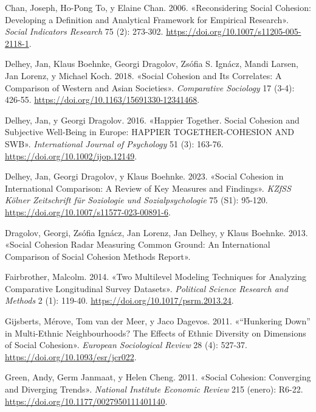 \documentclass[
  spanish,
  letterpaper,
  DIV=11,
  numbers=noendperiod]{scrartcl}
\newlength{\cslhangindent}
\newenvironment{CSLReferences}[2] %
 {\begin{list}{}{%
  \setlength{\itemindent}{0pt}
  \setlength{\leftmargin}{0pt}
  \setlength{\parsep}{0pt}
  \ifodd #1
   \setlength{\leftmargin}{\cslhangindent}
   \setlength{\itemindent}{-1\cslhangindent}
  \fi
  \setlength{\itemsep}{#2\baselineskip}}}
 {\end{list}}
\begin{document}
\begin{CSLReferences}{1}{0}
Chan, Joseph, Ho-Pong To, y Elaine Chan. 2006. {«Reconsidering {Social
Cohesion}: {Developing} a {Definition} and {Analytical Framework} for
{Empirical Research}»}. \emph{Social Indicators Research} 75 (2):
273-302. \url{https://doi.org/10.1007/s11205-005-2118-1}.

Delhey, Jan, Klaus Boehnke, Georgi Dragolov, Zsófia S. Ignácz, Mandi
Larsen, Jan Lorenz, y Michael Koch. 2018. {«Social {Cohesion} and {Its
Correlates}: A {Comparison} of {Western} and {Asian Societies}»}.
\emph{Comparative Sociology} 17 (3-4): 426-55.
\url{https://doi.org/10.1163/15691330-12341468}.

Delhey, Jan, y Georgi Dragolov. 2016. {«Happier {Together}. {Social
Cohesion} and {Subjective Well-Being} in {Europe}: {HAPPIER
TOGETHER-COHESION AND SWB}»}. \emph{International Journal of Psychology}
51 (3): 163-76. \url{https://doi.org/10.1002/ijop.12149}.

Delhey, Jan, Georgi Dragolov, y Klaus Boehnke. 2023. {«Social {Cohesion}
in {International Comparison}: A {Review} of {Key Measures} and
{Findings}»}. \emph{KZfSS K{ö}lner Zeitschrift f{ü}r Soziologie und
Sozialpsychologie} 75 (S1): 95-120.
\url{https://doi.org/10.1007/s11577-023-00891-6}.

Dragolov, Georgi, Zsófia Ignácz, Jan Lorenz, Jan Delhey, y Klaus
Boehnke. 2013. {«Social {Cohesion Radar Measuring Common Ground}: {An
International Comparison} of {Social Cohesion Methods Report}»}.

Fairbrother, Malcolm. 2014. {«Two {Multilevel Modeling Techniques} for
{Analyzing Comparative Longitudinal Survey Datasets}»}. \emph{Political
Science Research and Methods} 2 (1): 119-40.
\url{https://doi.org/10.1017/psrm.2013.24}.

Gijsberts, Mérove, Tom van der Meer, y Jaco Dagevos. 2011.
{«{``{Hunkering Down}''} in {Multi-Ethnic Neighbourhoods}? {The Effects}
of {Ethnic Diversity} on {Dimensions} of {Social Cohesion}»}.
\emph{European Sociological Review} 28 (4): 527-37.
\url{https://doi.org/10.1093/esr/jcr022}.

Green, Andy, Germ Janmaat, y Helen Cheng. 2011. {«Social {Cohesion}:
{Converging} and {Diverging Trends}»}. \emph{National Institute Economic
Review} 215 (enero): R6-22.
\url{https://doi.org/10.1177/0027950111401140}.


\end{CSLReferences}
\end{document}
